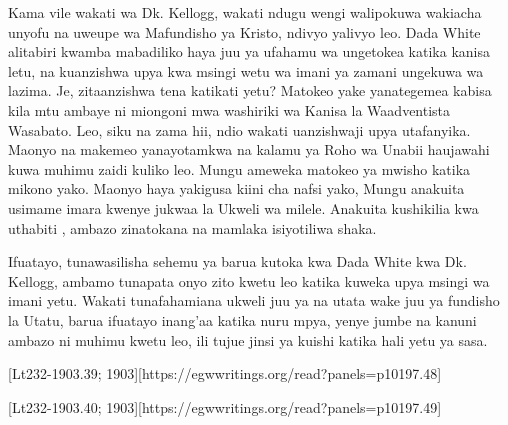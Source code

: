 Kama vile wakati wa Dk. Kellogg, wakati ndugu wengi walipokuwa wakiacha unyofu na uweupe wa Mafundisho ya Kristo, ndivyo yalivyo leo. Dada White alitabiri kwamba mabadiliko haya juu ya ufahamu wa  ungetokea katika kanisa letu, na kuanzishwa upya kwa msingi wetu wa imani ya zamani ungekuwa wa lazima. Je,  zitaanzishwa tena katikati yetu? Matokeo yake yanategemea kabisa kila mtu ambaye ni miongoni mwa washiriki wa Kanisa la Waadventista Wasabato. Leo, siku na zama hii, ndio wakati uanzishwaji upya utafanyika. Maonyo na makemeo yanayotamkwa na kalamu ya Roho wa Unabii haujawahi kuwa muhimu zaidi kuliko leo. Mungu ameweka matokeo ya mwisho katika mikono yako. Maonyo haya yakigusa kiini cha nafsi yako, Mungu anakuita usimame imara kwenye jukwaa la Ukweli wa milele. Anakuita kushikilia kwa uthabiti , ambazo zinatokana na mamlaka isiyotiliwa shaka.



Ifuatayo, tunawasilisha sehemu ya barua kutoka kwa Dada White kwa Dk. Kellogg, ambamo tunapata onyo zito kwetu leo katika kuweka upya msingi wa imani yetu. Wakati tunafahamiana ukweli juu ya  na utata wake juu ya fundisho la Utatu, barua ifuatayo inang'aa katika nuru mpya, yenye jumbe na kanuni ambazo ni muhimu kwetu leo, ili tujue jinsi ya kuishi katika hali yetu ya sasa.




[Lt232-1903.39; 1903][https://egwwritings.org/read?panels=p10197.48]


[Lt232-1903.40; 1903][https://egwwritings.org/read?panels=p10197.49]


